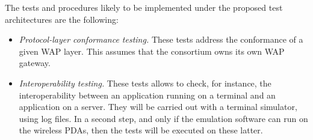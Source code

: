      The tests and procedures likely to be implemented under the
     proposed test architectures are the following:

     \begin{itemize}

       \item \emph{Protocol-layer conformance testing.} These tests address
             the conformance of a given WAP layer. This assumes that
             the consortium owns its own WAP gateway.

       \item \emph{Interoperability testing.} These
             tests allows to check, for instance, the interoperability
             between an application running on a terminal and an
             application on a server. They will be carried out with a
             terminal simulator, using log files. In a second step,
             and only if the emulation software can run on the
             wireless PDAs, then the tests will be executed on these
             latter.


     \end{itemize}

